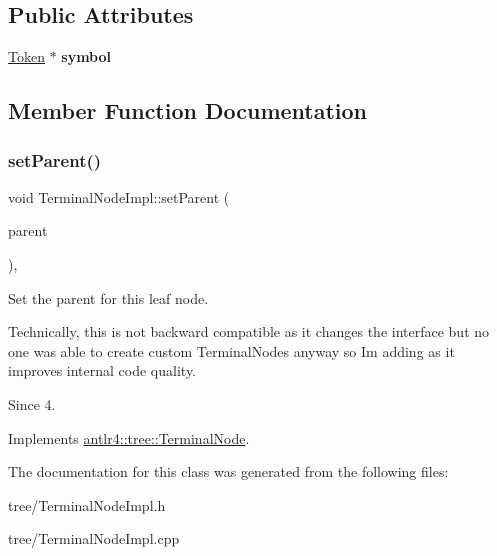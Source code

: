 \subsection*{Public Attributes}
\begin{DoxyCompactItemize}
\item 
\mbox{\label{classantlr4_1_1tree_1_1TerminalNodeImpl_a54b6691c19ae016bc378dd97d03c02f5}} 
\hyperlink{classantlr4_1_1Token}{Token} $\ast$ {\bfseries symbol}
\end{DoxyCompactItemize}


\subsection{Member Function Documentation}
\mbox{\label{classantlr4_1_1tree_1_1TerminalNodeImpl_a4043200d8cd1c741ca2f63ac173d30a0}} 
\subsubsection{\texorpdfstring{set\+Parent()}{setParent()}}
{\footnotesize\ttfamily void Terminal\+Node\+Impl\+::set\+Parent (\begin{DoxyParamCaption}\item[{\hyperlink{classantlr4_1_1RuleContext}{Rule\+Context} $\ast$}]{parent }\end{DoxyParamCaption})\hspace{0.3cm}{\ttfamily [override]}, {\ttfamily [virtual]}}

Set the parent for this leaf node.

Technically, this is not backward compatible as it changes the interface but no one was able to create custom Terminal\+Nodes anyway so I\textquotesingle{}m adding as it improves internal code quality.

\begin{DoxySince}{Since}
4. 
\end{DoxySince}


Implements \hyperlink{classantlr4_1_1tree_1_1TerminalNode_ae3a053a21cb472c8198eb831f8757a95}{antlr4\+::tree\+::\+Terminal\+Node}.



The documentation for this class was generated from the following files\+:\begin{DoxyCompactItemize}
\item 
tree/Terminal\+Node\+Impl.\+h\item 
tree/Terminal\+Node\+Impl.\+cpp\end{DoxyCompactItemize}
